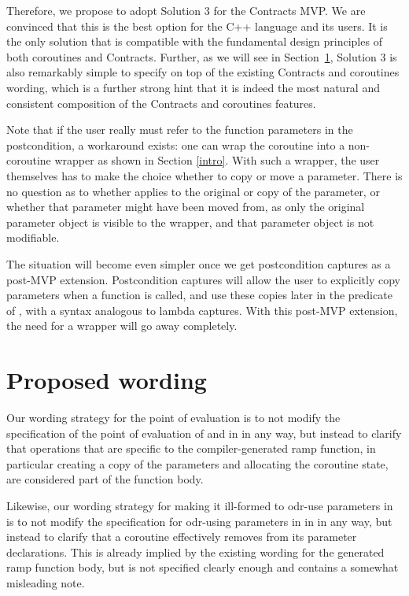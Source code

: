 Therefore, we propose to adopt Solution 3 for the Contracts MVP. We are convinced that this is the best option for the C++ language and its users. It is the only solution that is compatible with the fundamental design principles of both coroutines and Contracts. Further, as we will see in Section~\ref{wording}, Solution 3 is also remarkably simple to specify on top of the existing Contracts and coroutines wording, which is a further strong hint that it is indeed the most natural and consistent composition of the Contracts and coroutines features.

Note that if the user really must refer to the function parameters in the postcondition, a workaround exists: one can wrap the coroutine into a non-coroutine wrapper as shown in Section \ref{intro}. With such a wrapper, the user themselves has to make the choice whether to copy or move a parameter. There is no question as to whether  applies to the original or copy of the parameter, or whether that parameter might have been moved from, as only the original parameter object is visible to the wrapper, and that parameter object is not modifiable.

The situation will become even simpler once we get postcondition captures \cite{P3098R0} as a post-MVP extension. Postcondition captures will allow the user to explicitly copy parameters when a function is called, and use these copies later in the predicate of , with a syntax analogous to lambda captures. With this post-MVP extension, the need for a wrapper will go away completely.

\section{Proposed wording}
\label{wording}

Our wording strategy for the point of evaluation is to not modify the specification of the point of evaluation of  and  in \cite{P2900R8} in any way, but instead to clarify that  operations that are specific to the compiler-generated ramp function, in particular creating a copy of the parameters and allocating the coroutine state, are considered part of the function body.

Likewise, our wording strategy for making it ill-formed to odr-use parameters in  is to not modify the specification for odr-using parameters in  in \cite{P2900R8} in any way, but instead to clarify that a coroutine effectively removes  from its parameter declarations. This is already implied by the existing wording for the generated ramp function body, but is not specified clearly enough and contains a somewhat misleading note.

